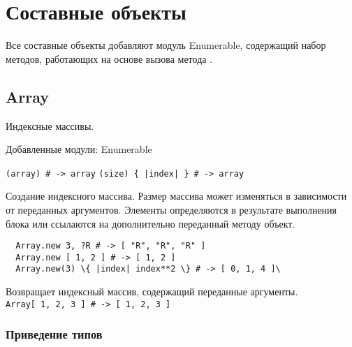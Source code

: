 \chapter{Составные объекты}

Все составные объекты добавляют модуль Enumerable, содержащий набор методов, работающих на основе вызова метода .

\section{Array}

Индексные массивы.

Добавленные модули: Enumerable 

\begin{methodlist}
  \verb!(array) # -> array!
  \verb!(size) { |index| } # -> array!

  Создание индексного массива. Размер массива может изменяться в зависимости от переданных аргументов. Элементы определяются в результате выполнения блока или ссылаются на дополнительно переданный методу объект.
  \begin{verbatim}
  Array.new 3, ?R # -> [ "R", "R", "R" ]
  Array.new [ 1, 2 ] # -> [ 1, 2 ]
  Array.new(3) \{ |index| index**2 \} # -> [ 0, 1, 4 ]\
  \end{verbatim}

  Возвращает индексный массив, содержащий переданные аргументы. 
  \\\verb!Array[ 1, 2, 3 ] # -> [ 1, 2, 3 ]!
\end{methodlist}

\subsection*{Приведение типов} 

